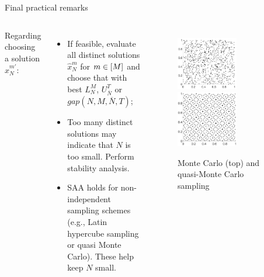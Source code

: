 \begin{frame}{Final practical remarks}
	\begin{columns}
	Regarding choosing a solution $\hat{x}^{m'}_N$:
	\begin{itemize}[<+->]
		\item If feasible, evaluate all distinct solutions $\hat{x}^{m}_N$ for $m \in \left[ M \right]$ and choose that with \alert{best} $L_N^M$, $U_{\overline{N}}^T$ or $gap(N,M,\overline{N},T)$;
		\item Too many \alert{distinct} solutions may indicate that $N$ is too \alert{small}. Perform stability analysis.
		\item SAA holds for \alert{non-independent} sampling schemes (e.g., Latin hypercube sampling or quasi Monte Carlo). These help keep $N$ small.
	\end{itemize}
	
	\vspace{-12pt}
	{\onslide<+->
	\begin{figure}
	    \centering
	    \includegraphics[width=0.6\textwidth]{figures/Monte_carlo.pdf}
		\includegraphics[width=0.6\textwidth]{figures/quasi_mc.pdf}	
		\caption{Monte Carlo (top) and quasi-Monte Carlo sampling  {\scriptsize\cite{fernandez2018optimizing}}}
	\end{figure}
	}	
	\end{columns}
	
\end{frame}


